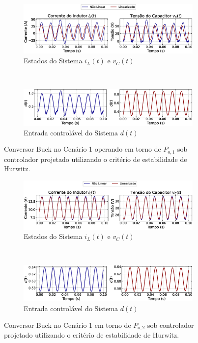 \begin{figure}[H]
  \centering
  \captionsetup{justification=centering}
  \begin{subfigure}{1.\textwidth}
    \centering
    \includegraphics[width=1.\textwidth]{figuras/classic/buck/sim1/op1/result.eps}
    \caption{Estados do Sistema $i_L(t)$  e $v_C(t)$}
  \end{subfigure}
  \\[6pt]
  \begin{subfigure}{1.\textwidth}
    \centering
    \includegraphics[width=1.\textwidth]{figuras/classic/buck/sim1/op1/duty-cycle.eps}
    \caption{Entrada controlável do Sistema $d(t)$}
  \end{subfigure}
  \caption{Conversor Buck no Cenário 1 operando em torno de $P_{\mathrm{o}, 1}$ sob controlador projetado utilizando o critério de estabilidade de Hurwitz.}
  \label{fig:classic_buck_cen1_op1}
  \begin{subfigure}{1.\textwidth}
    \centering
    \includegraphics[width=1.\textwidth]{figuras/classic/buck/sim1/op2/result.eps}
    \caption{Estados do Sistema $i_L(t)$  e $v_C(t)$}
  \end{subfigure}
  \\[6pt]
  \begin{subfigure}{1.\textwidth}
    \centering
    \includegraphics[width=1.\textwidth]{figuras/classic/buck/sim1/op2/duty-cycle.eps}
    \caption{Entrada controlável do Sistema $d(t)$}
  \end{subfigure}
  \caption{Conversor Buck no Cenário 1 em torno de $P_{\mathrm{o}, 2}$ sob controlador projetado utilizando o critério de estabilidade de Hurwitz.}
  \label{fig:classic_buck_cen1_op2}
\end{figure}

